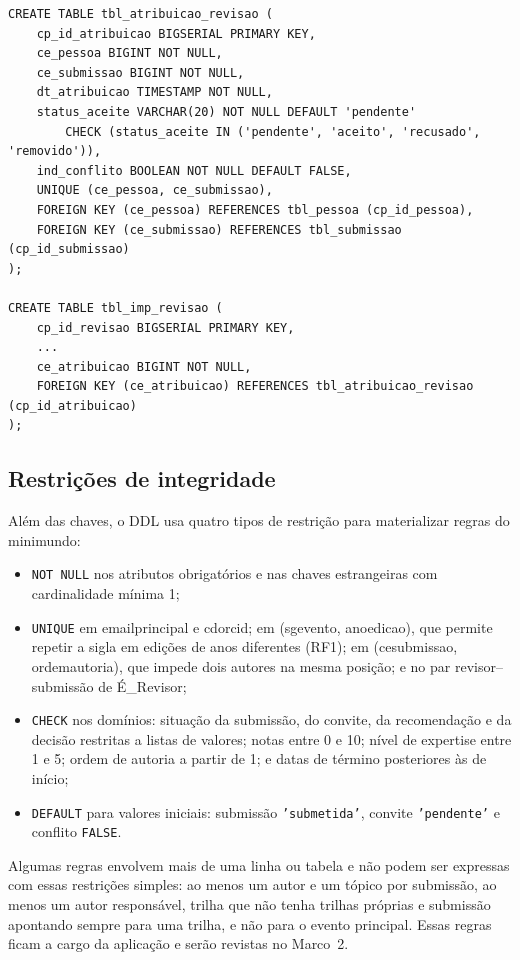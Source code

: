 \documentclass[12pt,a4paper]{article}
\newcommand{\tbus}{\textunderscore\allowbreak}
\newcommand{\tb}[1]{{\ttfamily\let\_\tbus #1}}
\newcommand{\rel}[1]{\textsf{#1}}
\begin{document}
\begin{lstlisting}[float=htbp,caption={Tradução da entidade associativa \rel{É\_Revisor} e do relacionamento \rel{Gera\_Parecer} (trecho do \tb{schema.sql}).},label={lst:atribuicao}]
CREATE TABLE tbl_atribuicao_revisao (
    cp_id_atribuicao BIGSERIAL PRIMARY KEY,
    ce_pessoa BIGINT NOT NULL,
    ce_submissao BIGINT NOT NULL,
    dt_atribuicao TIMESTAMP NOT NULL,
    status_aceite VARCHAR(20) NOT NULL DEFAULT 'pendente'
        CHECK (status_aceite IN ('pendente', 'aceito', 'recusado', 'removido')),
    ind_conflito BOOLEAN NOT NULL DEFAULT FALSE,
    UNIQUE (ce_pessoa, ce_submissao),
    FOREIGN KEY (ce_pessoa) REFERENCES tbl_pessoa (cp_id_pessoa),
    FOREIGN KEY (ce_submissao) REFERENCES tbl_submissao (cp_id_submissao)
);

CREATE TABLE tbl_imp_revisao (
    cp_id_revisao BIGSERIAL PRIMARY KEY,
    ...
    ce_atribuicao BIGINT NOT NULL,
    FOREIGN KEY (ce_atribuicao) REFERENCES tbl_atribuicao_revisao (cp_id_atribuicao)
);
\end{lstlisting}

\subsection{Restrições de integridade}
Além das chaves, o DDL usa quatro tipos de restrição para materializar regras do
minimundo:
\begin{itemize}
    \item \texttt{NOT NULL} nos atributos obrigatórios e nas chaves estrangeiras com
    cardinalidade mínima 1;
    \item \texttt{UNIQUE} em \tb{email\_principal} e \tb{cd\_orcid}; em (\tb{sg\_evento},
    \tb{ano\_edicao}), que permite repetir a sigla em edições de anos diferentes (RF1);
    em (\tb{ce\_submissao}, \tb{ordem\_autoria}), que impede dois autores na mesma
    posição; e no par revisor--submissão de \rel{É\_Revisor};
    \item \texttt{CHECK} nos domínios: situação da submissão, do convite, da recomendação
    e da decisão restritas a listas de valores; notas entre 0 e 10; nível de expertise
    entre 1 e 5; ordem de autoria a partir de 1; e datas de término posteriores às de
    início;
    \item \texttt{DEFAULT} para valores iniciais: submissão \texttt{'submetida'}, convite
    \texttt{'pendente'} e conflito \texttt{FALSE}.
\end{itemize}

Algumas regras envolvem mais de uma linha ou tabela e não podem ser expressas com
essas restrições simples: ao menos um autor e um tópico por submissão, ao menos um
autor responsável, trilha que não tenha trilhas próprias e submissão apontando sempre
para uma trilha, e não para o evento principal. Essas regras ficam a cargo da aplicação
e serão revistas no Marco~2.
\end{document}
